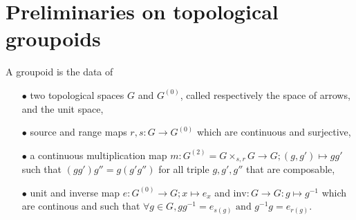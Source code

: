 \section{Preliminaries on topological groupoids}

\begin{definition}
A groupoid is the data of 
\begin{itemize}
\item[$\bullet$] two topological spaces $G$ and $G^{(0)}$, called respectively the space of arrows, and the unit space,
\item[$\bullet$] source and range maps $r,s : G\rightarrow G^{(0)}$ which are continuous and surjective,
\item[$\bullet$] a continuous multiplication map $m : G^{(2)}=G\times_{s,r}G\rightarrow G; (g,g')\mapsto gg'$ such that $(gg')g''=g(g'g'')$ for all triple $g,g',g''$ that are composable,
\item[$\bullet$] unit and inverse map $e : G^{(0)}\rightarrow G; x\mapsto e_x$ and $\text{inv} : G\rightarrow G: g\mapsto g^{-1}$ which are continous and such that $\forall g\in G, gg^{-1}=e_{s(g)} \text{ and }g^{-1}g=e_{r(g)}$.
\end{itemize} 
\end{definition}
